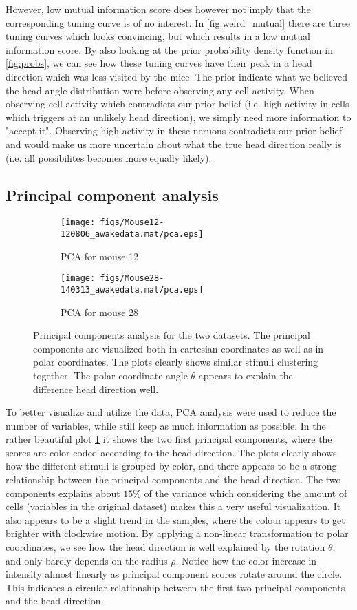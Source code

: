 However, low mutual information score does however not imply that the corresponding tuning curve is of no interest. In \cref{fig:weird_mutual} there are three tuning curves which looks convincing, but which results in a low mutual information score. By also looking at the prior probability density function in \cref{fig:probs}, we can see how these tuning curves have their peak in a head direction which was less visited by the mice. The prior indicate what we believed the head angle distribution were before observing any cell activity. When observing cell activity which contradicts our prior belief (i.e. high activity in cells which triggers at an unlikely head direction), we simply need more information to "accept it". Observing high activity in these neruons contradicts our prior belief and would make us more uncertain about what the true head direction really is (i.e. all possibilites becomes more equally likely). 

\subsection{Principal component analysis}
\begin{figure}[H]
    \centering
    \begin{subfigure}[b]{0.49\textwidth}
        \texttt{[image: figs/Mouse12-120806\_awakedata.mat/pca.eps]}
        \caption{PCA for mouse 12}
    \end{subfigure}
    \begin{subfigure}[b]{0.49\textwidth}
        \texttt{[image: figs/Mouse28-140313\_awakedata.mat/pca.eps]}
        \caption{PCA for mouse 28}

    \end{subfigure}
    \caption{Principal components analysis for the two datasets. The principal components are visualized both in cartesian coordinates as well as in polar coordinates. The plots clearly shows similar stimuli clustering together. The polar coordinate angle $\theta$ appears to explain the difference head direction well.}
    \label{fig:pca}
\end{figure}
To better visualize and utilize the data, PCA analysis were used to reduce the number of variables, while still keep as much information as possible. In the rather beautiful plot \cref{fig:pca} it shows the two first principal components, where the scores are color-coded according to the head direction. The plots clearly shows how the different stimuli is grouped by color, and there appears to be a strong relationship between the principal components and the head direction. The two components explains about $15\%$ of the variance which considering the amount of cells (variables in the original dataset) makes this a very useful visualization. 
It also appears to be a slight trend in the samples, where the colour appears to get brighter with clockwise motion. By applying a non-linear transformation to polar coordinates, we see how the head direction is well explained by the rotation $\theta$, and only barely depends on the radius $\rho$. Notice how the color increase in intensity almost linearly as principal component scores rotate around the circle. This indicates a circular relationship between the first two principal components and the head direction. 
